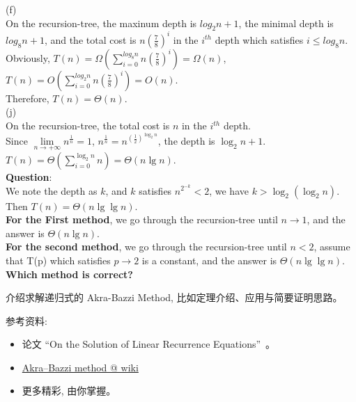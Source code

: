 \documentclass[a4paper, justified]{tufte-handout}
\begin{document}
\begin{solution}
(f)\\
On the  recursion-tree, the maxinum depth is  $log_2{n}+1$, the minimal depth is $log_8{n}+1$, and the total cost is  $n(\frac{7}{8})^i$  in the $i^{th}$ depth which satisfies $i\leq log_8{n}$.\\  
Obviously, $T(n)=\Omega(\sum\limits_{i=0}^{log_8n}n(\frac{7}{8})^i)=\Omega(n)$, $T(n)=O(\sum\limits_{i=0}^{log_2n}n(\frac{7}{8})^i)=O(n)$.\\
Therefore, $T(n)=\Theta(n)$.\\
(j)\\
On the  recursion-tree, the total cost is  $n$ in the $i^{th}$ depth.\\  
Since $\lim\limits_{n\to +\infty}n^{\frac{1}{n}}=1$, $n^{\frac{1}{n}}=n^{(\frac{1}{2})^{\log_2n}}$, the depth is $\log_2n+1$.\\
$T(n)=\Theta(\sum\limits_{i=0}^{\log_2n}n)=\Theta(n\lg n)$.\\

\noindent \textbf{Question}:\\
We note the depth as $k$, and $k$ satisfies $n^{2^{-k}}<2$, we have $k>\log_2(\log_2n)$.\\
Then $T(n)=\Theta(n\lg\lg n)$.\\
\textbf{For the First method}, we go through the recursion-tree until $n\to 1$, and the answer is $\Theta(n\lg n)$. \\
\textbf{For the second method}, we go through the recursion-tree until $n<2$,  assume that T(p) which satisfies $p\to 2$ is a constant, and the answer is $\Theta(n\lg \lg n)$.\\
\textbf{Which method is correct?}
\end{solution}

\beginot

\begin{ot}
  介绍求解递归式的 Akra-Bazzi Method, 比如定理介绍、应用与简要证明思路。

  \noindent 参考资料:
  \begin{itemize}
    \item 论文 ``On the Solution of Linear Recurrence Equations''~\cite{ABMethod}。
    \item \href{https://en.wikipedia.org/wiki/Akra\%E2\%80\%93Bazzi\_method}{Akra–Bazzi method @ wiki}
    \item 更多精彩, 由你掌握。
  \end{itemize}
\end{ot}
\end{document}
